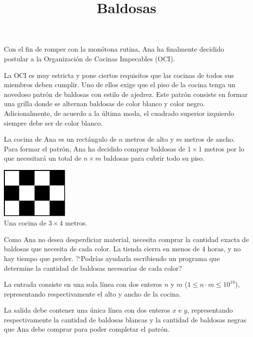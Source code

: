 \documentclass{oci}
\title{Baldosas}
\begin{document}
\begin{problemDescription}
  Con el fin de romper con la monótona rutina, Ana ha
  finalmente decidido postular a la Organización de
  Cocinas Impecables (OCI).

  La OCI es muy estricta y pone ciertos requisitos que
  las cocinas de todos sus miembros deben cumplir.
  Uno de ellos exige que el piso de la cocina tenga un novedoso
  patrón de baldosas con estilo de ajedrez.
  Este patrón consiste en formar una grilla
  donde se alternan baldosas de color blanco y color negro.
  Adicionalmente, de acuerdo a la última moda, el cuadrado
  superior izquierdo siempre debe ser de color blanco.

  La cocina de Ana es un rectángulo de $n$ metros de alto y $m$
  metros de ancho.
  Para formar el patrón, Ana ha decidido comprar baldosas de
  $1\times 1$ metros por lo que necesitará un total de $n\times m$
  baldosas para cubrir todo su piso.

  \begin{center}
    \includegraphics[width=0.25\textwidth]{example-checkerboard.pdf} \\
    Una cocina de $3 \times 4$ metros.
  \end{center}

  Como Ana no desea desperdiciar material, necesita comprar
  la cantidad exacta de baldosas que necesita de cada color.
  La tienda cierra en menos de $4$ horas, y no hay tiempo que perder.
  ?`Podrías ayudarla escribiendo un programa que determine la cantidad
  de baldosas necesarias de cada color?
\end{problemDescription}

\begin{inputDescription}
  La entrada consiste en una sola línea con dos enteros $n$ y $m$
  ($1 \leq n \cdot m \leq 10^{18}$), representando respectivamente
  el alto y ancho de la cocina.
\end{inputDescription}

\begin{outputDescription}
  La salida debe contener una única línea con dos enteros $x$ e $y$,
  representando respectivamente la cantidad de baldosas blancas y
  la cantidad de baldosas negras que Ana debe comprar para poder
  completar el patrón.
\end{outputDescription}
\end{document}
